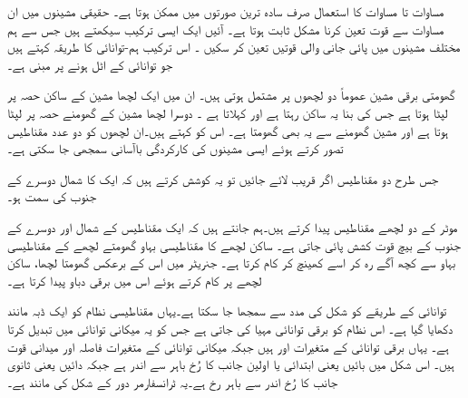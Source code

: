مساوات  تا مساوات  کا استعمال صرف سادہ ترین صورتوں میں ممکن ہوتا ہے۔ حقیقی  مشینوں میں ان مساوات سے قوت  تعین کرنا مشکل ثابت ہوتا ہے۔ آئیں  ایک ایسی ترکیب  سیکھتے ہیں جس سے ہم  مختلف مشینوں میں پائی جانی والی  قوتیں  تعین کر سکیں ۔ اس ترکیب ہم-توانائی کا طریقہ کہتے ہیں جو توانائی کے اٹل ہونے پر مبنی ہے۔

گھومتی برقی مشین عموماً دو لچھوں پر مشتمل ہوتی ہیں۔ ان میں ایک لچھا  مشین کے ساکن حصہ پر لپٹا ہوتا ہے جس کی بنا یہ ساکن رہتا ہے اور    کہلاتا ہے ۔  دوسرا لچھا  مشین کے گھومنے  حصہ پر لپٹا ہوتا ہے اور مشین گھومنے سے یہ بھی گھومتا ہے۔ اس کو   کہتے ہیں۔ان  لچھوں کو دو عدد مقناطیس تصور کرتے ہوئے ایسی مشینوں کی کارکردگی  باآسانی  سمجھی جا سکتی ہے۔

 جس طرح دو مقناطیس اگر قریب لائے جائیں تو یہ کوشش کرتے ہیں کہ ایک کا شمال  دوسرے کے جنوب  کی سمت  ہو۔

 موٹر کے دو  لچھے مقناطیس پیدا کرتے ہیں۔ہم جانتے ہیں کہ  ایک مقناطیس  کے شمال  اور دوسرے کے جنوب  کے بیچ قوت کشش پائی جاتی ہے۔ ساکن لچھے کا مقناطیسی بہاو  گھومتے لچھے کے مقناطیسی بہاو سے کچھ آگے رہ کر اسے کھینچ  کر  کام کرتا ہے۔ جنریٹر میں اس کے برعکس  گھومتا لچھا، ساکن لچھے پر کام کرتے ہوئے اس میں برقی دباو پیدا کرتا ہے۔

توانائی کے طریقے کو شکل   کی مدد سے سمجھا جا سکتا ہے۔یہاں مقناطیسی نظام کو ایک ڈبہ  مانند دکھایا گیا ہے۔ اس نظام کو برقی توانائی مہیا کی جاتی ہے جس کو یہ میکانی توانائی میں تبدیل کرتا ہے۔ یہاں برقی توانائی کے متغیرات   اور  ہیں جبکہ میکانی توانائی کے متغیرات فاصلہ  اور میدانی قوت  ہیں۔ اس شکل میں بائیں یعنی ابتدائی یا اولین جانب  کا رُخ باہر سے اندر ہے جبکہ  دائیں یعنی ثانوی جانب   کا رُخ اندر سے  باہر رخ ہے۔یہ  ٹرانسفارمر دور کے شکل   کی مانند ہے۔

